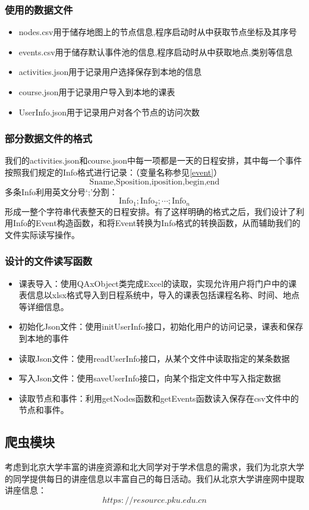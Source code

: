 \documentclass[11pt,hyperref,a4paper,UTF8]{ctexart}
\begin{document}
\begin{CJK}{UTF8}{gkai}
\subsubsection{使用的数据文件}
\begin{itemize}
    \item nodes.csv用于储存地图上的节点信息,程序启动时从中获取节点坐标及其序号
    \item events.csv用于储存默认事件池的信息,程序启动时从中获取地点,类别等信息
    \item activities.json用于记录用户选择保存到本地的信息
    \item course.json用于记录用户导入到本地的课表
    \item UserInfo.json用于记录用户对各个节点的访问次数
\end{itemize}

\subsubsection{部分数据文件的格式}
我们的activities.json和course.json中每一项都是一天的日程安排，其中每一个事件按照我们规定的Info格式进行记录：（变量名称参见\ref{event}）
\[\text{Sname,Sposition,iposition,begin,end}\]
多条Info利用英文分号`;'分割：
\[\text{Info}_1 ; \text{Info}_2; \cdots ; \text{Info}_n\]
形成一整个字符串代表整天的日程安排。有了这样明确的格式之后，我们设计了利用Info的Event构造函数，和将Event转换为Info格式的转换函数，从而辅助我们的文件实际读写操作。

\subsubsection{设计的文件读写函数}
\begin{itemize}
    \item 课表导入：使用QAxObject类完成Excel的读取，实现允许用户将门户中的课表信息以xlsx格式导入到日程系统中，导入的课表包括课程名称、时间、地点等详细信息。
    \item 初始化Json文件：使用initUserInfo接口，初始化用户的访问记录，课表和保存到本地的事件
    \item 读取Json文件：使用readUserInfo接口，从某个文件中读取指定的某条数据
    \item 写入Json文件：使用saveUserInfo接口，向某个指定文件中写入指定数据
    \item 读取节点和事件：利用getNodes函数和getEvents函数读入保存在csv文件中的节点和事件。
\end{itemize}

\subsection{爬虫模块}
考虑到北京大学丰富的讲座资源和北大同学对于学术信息的需求，我们为北京大学的同学提供每日的讲座信息以丰富自己的每日活动。我们从北京大学讲座网中提取讲座信息：
\[https://resource.pku.edu.cn\]


\end{CJK}
\end{document}
